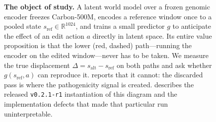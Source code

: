 {\begin{figure}[t]
{}
  \caption{\textbf{The object of study.} A latent world model over a frozen genomic encoder
  freezes Carbon-500M, encodes a reference window once to a pooled state
  $s_{\mathrm{ref}}\in\mathbb{R}^{1024}$, and trains a small predictor $g$ to anticipate the
  effect of an edit action $a$ directly in latent space. Its entire value proposition is that
  the lower (red, dashed) path---running the encoder on the edited window---never has to be
  taken. We measure the true displacement $\Delta=s_{\mathrm{alt}}-s_{\mathrm{ref}}$ on both
  paths and ask whether $g(s_{\mathrm{ref}},a)$ can reproduce it. 
  reports that it cannot: the discarded pass is where the pathogenicity signal is created.
   describes the released \texttt{v0.2.1-r1} instantiation of this
  diagram and the implementation defects that made that particular run uninterpretable.}
  \label{fig:architecture}
\end{figure}}

